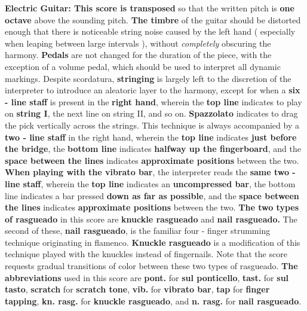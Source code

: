 \documentclass[12pt]{article}
\newcommand*\circled[1]{\tikz[baseline=(char.base)]{
            \node[shape=circle,draw,inner sep=1pt] (char) {#1};}}
\begin{document}
\begingroup
\textbf{Electric Guitar: \circled{1} This score is transposed } so that the written pitch is \textbf{one octave} above the sounding pitch. \textbf{\circled{2} The timbre} of the guitar should be distorted enough that there is noticeable string noise caused by the left hand ( especially when leaping between large intervals ), without \textit{completely} obscuring the harmony. \textbf{\circled{3} Pedals} are not changed for the duration of the piece, with the exception of a volume pedal, which should be used to interpret all dynamic markings. \textbf{\circled{4}} Despite scordatura, \textbf{stringing} is largely left to the discretion of the interpreter to introduce an aleatoric layer to the harmony, except for when a \textbf{six - line staff} is present in the \textbf{right hand}, wherein the \textbf{top line} indicates to play on \textbf{string I}, the next line on string II, and so on. \textbf{\circled{5} Spazzolato} indicates to drag the pick vertically across the strings. This technique is always accompanied by a \textbf{two - line staff} in the right hand, wherein the \textbf{top line} indicates \textbf{just before the bridge}, the \textbf{bottom line} indicates \textbf{halfway up the fingerboard}, and the \textbf{space between the lines} indicates \textbf{approximate positions} between the two. \textbf{\circled{6} When playing with the vibrato bar}, the interpreter reads the \textbf{same two - line staff}, wherein the \textbf{top line} indicates an \textbf{uncompressed bar}, the bottom line indicates a bar pressed \textbf{down as far as possible}, and the \textbf{space between the lines} indicates \textbf{approximate positions} between the two. \textbf{\circled{7} The two types of rasgueado} in this score are \textbf{knuckle rasgueado} and \textbf{nail rasgueado.} The second of these, \textbf{nail rasgueado}, is the familiar four - finger strumming technique originating in flamenco. \textbf{Knuckle rasgueado} is a modification of this technique played with the knuckles instead of fingernails. Note that the score requests gradual transitions of color between these two types of rasgueado. \textbf{\circled{8} The abbreviations} used in this score are \textbf{pont.} for \textbf{sul ponticello}, \textbf{tast.} for \textbf{sul tasto}, \textbf{scratch} for \textbf{scratch tone}, \textbf{vib.} for \textbf{vibrato bar}, \textbf{tap} for \textbf{finger tapping}, \textbf{kn. rasg.} for \textbf{knuckle rasgueado}, and \textbf{n. rasg.} for \textbf{nail rasgueado}.
\endgroup
\end{document}
